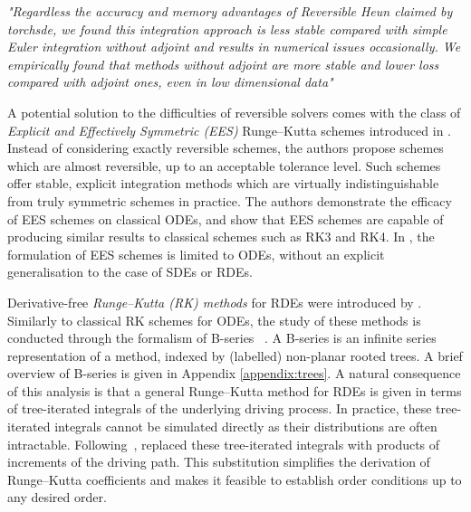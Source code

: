\documentclass{article} %
\theoremstyle{definition}
\theoremstyle{remark}
\begin{document}
\begin{displayquote}
\textit{"Regardless the accuracy and memory advantages of Reversible Heun claimed by torchsde, we found this integration approach is less stable compared with simple Euler integration without adjoint and results in numerical issues occasionally. We empirically found that methods without adjoint are more stable and lower loss compared with adjoint ones, even in low dimensional data" ~\citep{zhang2021path}}
\end{displayquote}

A potential solution to the difficulties of reversible solvers comes with the class of \emph{Explicit and Effectively Symmetric (EES)} Runge--Kutta schemes introduced in \cite{shmelev2025explicit}. Instead of considering exactly reversible schemes, the authors propose schemes which are almost reversible, up to an acceptable tolerance level. Such schemes offer stable, explicit integration methods which are virtually indistinguishable from truly symmetric schemes in practice. The authors demonstrate the efficacy of EES schemes on classical ODEs, and show that EES schemes are capable of producing similar results to classical schemes such as RK3 and RK4. In \cite{shmelev2025explicit}, the formulation of EES schemes is limited to ODEs, without an explicit generalisation to the case of SDEs or RDEs.

Derivative-free \emph{Runge--Kutta (RK) methods} for RDEs were introduced by \cite{redmann2022runge}. Similarly to classical RK schemes for ODEs, the study of these methods is conducted through the formalism of B-series ~\citep{hairer2006geometric,mclachlan2015butcher,butcher2021b}. A B-series is an infinite series representation of a method, indexed by (labelled) non-planar rooted trees. A brief overview of B-series is given in Appendix \ref{appendix:trees}. A natural consequence of this analysis is that a general Runge--Kutta method for RDEs is given in terms of tree-iterated integrals of the underlying driving process. In practice, these tree-iterated integrals cannot be simulated directly as their distributions are often intractable. Following~\citep{deya2012milstein}, \cite{redmann2022runge} replaced these tree-iterated integrals with products of increments of the driving path. This substitution simplifies the derivation of Runge--Kutta coefficients and makes it feasible to establish order conditions up to any desired order.
\end{document}
